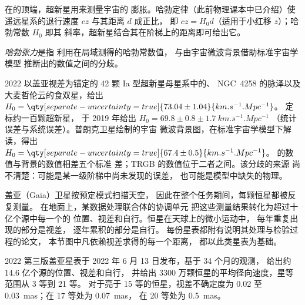 在的顶端，超新星用来测量宇宙的
膨胀。哈勃定律（此前物理课本中已介绍）使
遥远星系的退行速度 $cz$ 与其距离 $d$ 成正比，
即 $cz = H_0 d$（适用于小红移 $z$）；哈勃常数 $H_0$ 即其
斜率，超新星结合其在阶梯上的距离即可给出它。

\begin{definition}[哈勃张力]\label{def:b3:milky-way-galaxies:tension}
\emph{哈勃张力}是指
利用在局域测得的哈勃常数值，
与由宇宙微波背景借助标准宇宙学模型
推断出的数值之间的分歧。
\end{definition}

\begin{dated}{2022}
以盖亚视差为锚定的 42 颗 Ia 型超新星母星系中的、
NGC~4258 的脉泽以及
大麦哲伦云的食双星，给出
$H_0 = \qty[separate-uncertainty=true]{73.04 \pm 1.04}{km.s^{-1}.Mpc^{-1}}$。
定标约一百颗超新星，
于 2019 年给出 $H_0 = 69.8 \pm 0.8 \pm \qty{1.7}{km.s^{-1}.Mpc^{-1}}$
（统计误差与系统误差）。普朗克卫星绘制的宇宙
微波背景图，在标准宇宙学模型下解读，得出
$H_0 = \qty[separate-uncertainty=true]{67.4 \pm 0.5}{km.s^{-1}.Mpc^{-1}}$。
的数值与背景的数值相差五个标准
差；TRGB 的数值位于二者之间。该分歧的来源
尚不清楚：可能是某一级阶梯中尚未发现的误差，
也可能是模型中缺失的物理。
\end{dated}

\begin{inthelab}[天测卫星及其星表]
盖亚（Gaia）卫星按预定模式扫描天空，
因此在整个任务期间，每颗恒星都被反复测量。
在地面上，某数据处理联合体的协调单元
把这些测量结果转化为超过十亿个源中每一个的
位置、视差和自行。恒星在天球上的微小运动中，
每年重复出现的部分是视差，
逐年累积的部分是自行。
每份星表都附有说明其处理与检验过程的论文，
本节图中凡依赖视差求得的每一个距离，
都以此类星表为基础。
\end{inthelab}

\begin{dated}{2022}
第三版盖亚星表于 2022 年 6 月 13 日发布，基于 34 个月的观测，
给出约 14.6 亿个源的位置、视差和自行，
并给出 3300 万颗恒星的平均径向速度，星等范围从 3 等到 21 等。
对于亮于 15 等的恒星，视差不确定度为 0.02 至
\qty{0.03}{mas}；在 17 等处为 \qty{0.07}{mas}，
在 20 等处为 \qty{0.5}{mas}。
\end{dated}

